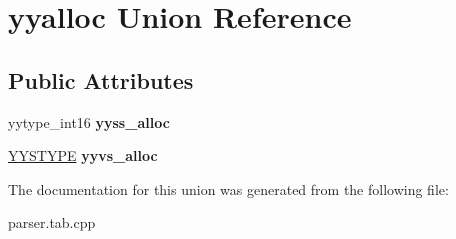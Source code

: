 \hypertarget{unionyyalloc}{}\section{yyalloc Union Reference}
\label{unionyyalloc}
\subsection*{Public Attributes}
\begin{DoxyCompactItemize}
\item 
\mbox{\label{unionyyalloc_a4800e0520a89a4789afa7b5d82197e65}} 
yytype\+\_\+int16 {\bfseries yyss\+\_\+alloc}
\item 
\mbox{\label{unionyyalloc_a9326f4fdc6f737a929444427836d8928}} 
\hyperlink{union_y_y_s_t_y_p_e}{Y\+Y\+S\+T\+Y\+PE} {\bfseries yyvs\+\_\+alloc}
\end{DoxyCompactItemize}


The documentation for this union was generated from the following file\+:\begin{DoxyCompactItemize}
\item 
parser.\+tab.\+cpp\end{DoxyCompactItemize}
